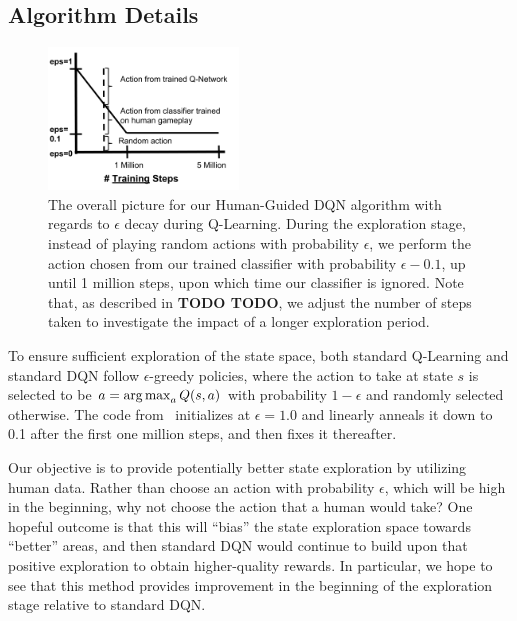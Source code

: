 \documentclass[letterpaper, 10pt, conference]{ieeeconf}
\begin{document}
\subsection{Algorithm Details}\label{ssec:algorithm}

\begin{figure}[t]
\centering
\includegraphics[width=0.45\textwidth]{figures/dqn_with_human_data_graph.png}
\caption{\footnotesize
The overall picture for our Human-Guided DQN algorithm with regards to
$\epsilon$ decay during Q-Learning. During the exploration stage, instead of
playing random actions with probability $\epsilon$, we perform the action chosen
from our trained classifier with probability $\epsilon-0.1$, up until 1 million
steps, upon which time our classifier is ignored. Note that, as described in
\textbf{TODO TODO}, we adjust the number of steps taken to investigate the
impact of a longer exploration period.
}
\label{fig:human-guided-dqn}
\end{figure}

To ensure sufficient exploration of the state space, both standard Q-Learning
and standard DQN follow $\epsilon$-greedy policies, where the action to take at
state $s$ is selected to be $a = \operatorname*{arg\,max}_a Q(s,a)$ with probability $1-\epsilon$
and randomly selected otherwise. The code from~\cite{mnih-dqn-2015} initializes
at $\epsilon=1.0$ and linearly anneals it down to 0.1 after the first one
million steps, and then fixes it thereafter.

Our objective is to provide potentially better state exploration by utilizing
human data. Rather than choose an action with probability $\epsilon$, which will
be high in the beginning, why not choose the action that a human would take? One
hopeful outcome is that this will ``bias'' the state exploration space towards
``better'' areas, and then standard DQN would continue to build upon that
positive exploration to obtain higher-quality rewards. In particular, we hope to
see that this method provides improvement in the beginning of the exploration
stage relative to standard DQN.
\end{document}
